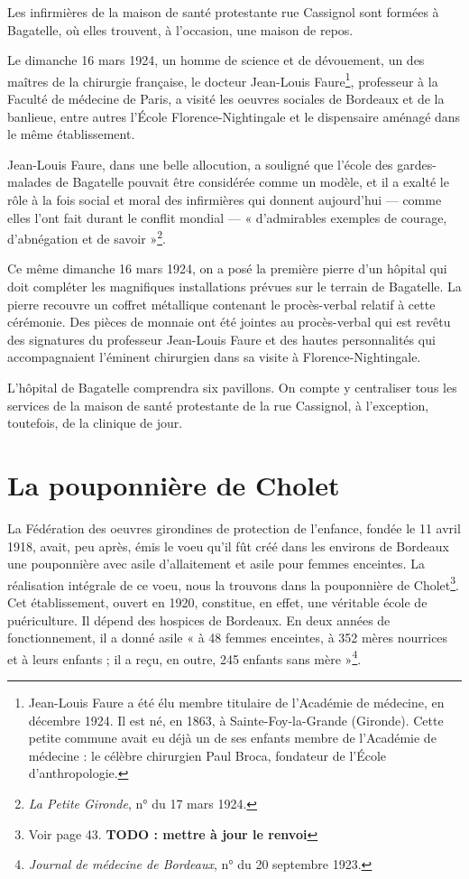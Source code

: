 \documentclass[a4paper,11pt]{book}
\begin{document}
Les infirmières de la maison de santé protestante rue Cassignol sont formées à Bagatelle, où elles trouvent, à l'occasion, une maison de repos.

Le dimanche 16 mars 1924, un homme de science et de dévouement, un des maîtres de la chirurgie française, le docteur Jean-Louis Faure\footnote{Jean-Louis Faure a été élu membre titulaire de l'Académie de médecine, en décembre 1924. Il est né, en 1863, à Sainte-Foy-la-Grande (Gironde). Cette petite commune avait eu déjà un de ses enfants membre de l'Académie de médecine : le célèbre chirurgien Paul Broca, fondateur de l'École d'anthropologie.}, professeur à la Faculté de médecine de Paris, a visité les oeuvres sociales de Bordeaux et de la banlieue, entre autres l'École Florence-Nightingale et le dispensaire aménagé dans le même établissement.

Jean-Louis Faure, dans une belle allocution, a souligné que l'école des gardes-malades de Bagatelle pouvait être considérée comme un modèle, et il a exalté le rôle à la fois social et moral des infirmières qui donnent aujourd'hui — comme elles l'ont fait durant le conflit mondial — « d'admirables exemples de courage, d'abnégation et de savoir »\footnote{\textit{La Petite Gironde}, n° du 17 mars 1924.}.

Ce même dimanche 16 mars 1924, on a posé la première pierre d'un hôpital qui doit compléter les magnifiques installations prévues sur le terrain de Bagatelle. La pierre recouvre un coffret métallique contenant le procès-verbal relatif à cette cérémonie. Des pièces de monnaie ont été jointes au procès-verbal qui est revêtu des signatures du professeur Jean-Louis Faure et des hautes personnalités qui accompagnaient l'éminent  chirurgien dans sa visite à Florence-Nightingale.

L'hôpital de Bagatelle comprendra six pavillons. On compte y centraliser tous les services de la maison de santé protestante de la rue Cassignol, à l'exception, toutefois, de la clinique de jour.

\section{La pouponnière de Cholet}

La Fédération des oeuvres girondines de protection de l'enfance, fondée le 11 avril 1918, avait, peu après, émis le voeu qu'il fût créé dans les environs de Bordeaux une
pouponnière avec asile d'allaitement et asile pour femmes enceintes. La réalisation intégrale de ce voeu, nous la trouvons dans la pouponnière de Cholet\footnote{Voir page 43. \textbf{TODO : mettre à jour le renvoi}}. Cet établissement, ouvert en 1920, constitue, en effet, une véritable école de puériculture. Il dépend des hospices de Bordeaux. En deux années de fonctionnement, il a donné asile « à 48 femmes enceintes, à 352 mères nourrices et à leurs enfants ; il a reçu, en outre, 245 enfants sans mère »\footnote{\textit{Journal de médecine de Bordeaux}, n° du 20 septembre 1923.}.
\end{document}
